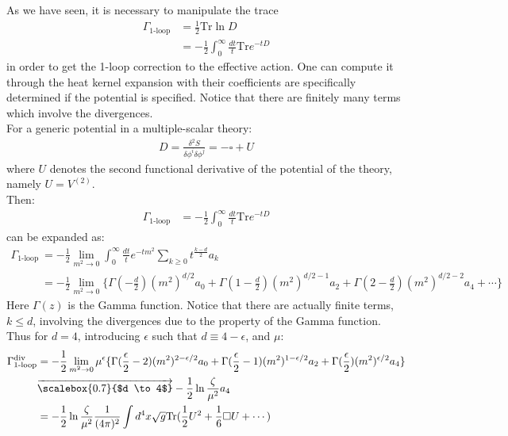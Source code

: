 \documentclass[fleqn]{article}
\begin{document}
As we have seen, it is necessary to manipulate the trace 
\begin{align}
\Gamma _{\text{1-loop}} &= \frac{1}{2} \text{Tr} \ln D \nonumber \\
&= -\frac{1}{2} \int _{0} ^{\infty} \frac{dt}{t} \text{Tr} e^{-tD}
\end{align}
in order to get the 1-loop correction to the effective action. One can compute it through the heat kernel expansion with their coefficients are specifically determined if the potential is specified. Notice that there are finitely many terms which involve the divergences. \\
For a generic potential in a multiple-scalar theory:
\begin{align}
D = \frac{\delta ^{2} S} {\delta \phi ^{i} \delta \phi ^{j}} = -\square + U
\end{align}
where $U$ denotes the second functional derivative of the potential of the theory, namely $U = V^{(2)}$. \\
Then:
\begin{align}
\Gamma _{\text{1-loop}} &= -\frac{1}{2} \int _{0}^{\infty} \frac{dt}{t} \text{Tr} e^{-tD}
\end{align}
can be expanded as:
\begin{align}
\Gamma_{\text{1-loop}} & = -\frac{1}{2}\lim_{m^{2} \to 0} \int _{0}^{\infty} \frac{dt}{t} e^{-tm^{2}}\sum_{k \geq 0} t^{\frac{k-d}{2}}a_{k} \nonumber \\
&= -\frac{1}{2} \lim_{m^{2}\to 0} \lbrace \Gamma(-\frac{d}{2})(m^{2})^{d/2}a_{0} + \Gamma(1-\frac{d}{2})(m^{2})^{d/2 -1}a_{2} + \Gamma(2-\frac{d}{2})(m^{2})^{d/2 - 2} a_{4} + \cdots \rbrace 
\end{align}
Here $\Gamma(z)$ is the Gamma function. Notice that there are actually finite terms,  $k \leq d$, involving the divergences due to the property of the Gamma function. Thus for $d=4$, introducing $\epsilon$ such that $d \equiv 4-\epsilon$, and $\mu$:
\begin{align}
\Gamma _{\text{1-loop}} ^{\text{div}} &= -\frac{1}{2} \lim _{m^{2} \to 0} \mu^{\epsilon} \lbrace \Gamma(\frac{\epsilon}{2} -2) (m^{2})^{2-\epsilon /2} a_{0} + \Gamma(\frac{\epsilon}{2} -1) (m^{2})^{1-\epsilon/2} a_{2} + \Gamma(\frac{\epsilon}{2})(m^{2})^{\epsilon /2}a_{4} \rbrace \nonumber \\
&\overrightarrow {\scalebox{0.7}{$d \to 4$}} -\frac{1}{2} \ln\frac{\zeta}{\mu ^{2}} a_{4} \nonumber \\
&= -\frac{1}{2} \ln \frac{\zeta}{\mu^{2}} \frac{1}{(4\pi)^{2}}\int d^4x \sqrt{g} \text{Tr}(\frac{1}{2} U^{2}+ \frac{1}{6} \square U + \cdots )
\end{align}
\end{document}
